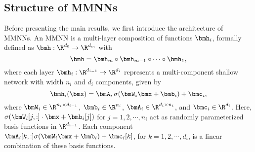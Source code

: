 \documentclass[11pt,a4paper]{article}
\let\ldots\cdots
\let\dots\cdots
\begin{document}


\subsection{Structure of MMNNs}
\label{sec:MMNN:structure}

Before presenting the main results, we first introduce the architecture of MMNNs. 
An MMNN is a multi-layer composition of functions $\bmh_i$, formally defined as $\bmh: \R^{d_0}\to \R^{d_m}$ with
\begin{equation}
    \label{eq:h:MMNN}
    \bmh = \bmh_m \circ \bmh_{m-1} \circ \cdots \circ \bmh_1,
\end{equation}
where each layer $\bmh_i: \R^{d_{i-1}} \to \R^{d_i}$ represents a multi-component shallow network with width $n_i$ and $d_i$ components, given by
\begin{equation*}
    \bmh_i(\bmx) = \bmA_i \, \sigma(\bmW_i \bmx + \bmb_i) + \bmc_i,
\end{equation*}
where $\bmW_i \in \R^{n_i \times d_{i-1}}$, $\bmb_i\in \R^{n_i}$, $\bmA_i \in \R^{d_i \times n_i}$, and $\bmc_i\in\R^{d_i}$. Here, $\sigma(\bmW_i{[j,:]} \cdot \bmx + \bmb_i[j])$ for $ j = 1, 2, \dots, n_i$ act as randomly parameterized basis functions in $\R^{d_{i-1}}$. Each component $\bmA_i[k,:]\sigma(\bmW_i\bmx+\bmb_i) +\bmc_i[k]$, for $ k=1,2, \ldots, d_i$, is a linear combination of these basis functions. 
\end{document}
